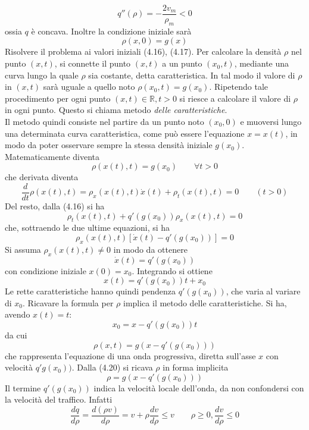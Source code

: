 \documentclass[a4paper,12pt, draft]{article}
\theoremstyle{break}
\numberwithin{equation}{section}
\begin{document}
\[
  q''(\rho) = -\frac{2v_m}{\rho_m} < 0
\]
ossia \(q\) è concava. Inoltre la condizione iniziale sarà 
\begin{equation}
  \rho(x, 0) = g(x)
\end{equation}
Risolvere il problema ai valori iniziali (4.16), (4.17). Per calcolare la densità \(\rho\) nel punto \((x,t)\), si connette il punto \((x,t)\) a un punto \((x_0, t)\), mediante una curva lungo la quale \(\rho\) sia costante, detta caratteristica.
In tal modo il valore di \(\rho\) in \((x,t)\) sarà uguale a quello noto \(\rho(x_0, t) = g(x_0)\). Ripetendo tale procedimento per ogni punto \((x,t) \in \mathbb{R}, t > 0\) si riesce a calcolare il valore di \(\rho\) in ogni punto. Questo si chiama metodo \emph{delle caratteristiche}. \\
Il metodo quindi consiste nel partire da un punto noto \((x_0, 0)\) e muoversi lungo una determinata curva caratteristica, come può essere l'equazione \(x = x(t)\), in modo da poter osservare sempre la stessa densità iniziale \(g(x_0)\).
Matematicamente diventa 
\begin{equation}
  \rho(x(t), t) = g(x_0) \qquad \forall t > 0
\end{equation}
che derivata diventa 
\[
\frac{d}{dt}\rho(x(t), t) = \rho_x(x(t), t) \dot{x}(t) +\rho_t(x(t), t) = 0 \qquad (t > 0)  
\]
Del resto, dalla (4.16) si ha
\[
  \rho_t(x(t), t) + q'(g(x_0))\rho_x(x(t), t) = 0
\]
che, sottraendo le due ultime equazioni, si ha 
\[
  \rho_x(x(t), t)[\dot{x}(t) - q'(g(x_0))] = 0
\]
Si assuma \(\rho_x(x(t), t) \not = 0\) in modo da ottenere
\[
  \dot{x}(t) = q'(g(x_0))
\]
con condizione iniziale \(x(0) = x_0\). Integrando si ottiene
\begin{equation}
  x(t) = q'(g(x_0))t + x_0
\end{equation}
Le rette caratteristiche hanno quindi pendenza \(q'(g(x_0))\), che varia al variare di \(x_0\). Ricavare la formula per \(\rho\) implica il metodo delle caratteristiche. Si ha, avendo \(x(t) = t\):
\[
  x_0 = x - q'(g(x_0))t
\]
da cui
\begin{equation}
  \rho(x,t) = g(x-q'(g(x_0)))
\end{equation}
che rappresenta l'equazione di una onda progressiva, diretta sull'asse \(x\) con velocità \(q'g(x_0))\). 
Dalla (4.20) si ricava \(\rho\) in forma implicita 
\[
  \rho = g(x - q'(g(x_0)))
\]
Il termine \(q'(g(x_0))\) indica la velocità locale dell'onda, da non confondersi con la velocità del traffico.
Infatti
\[
  \frac{dq}{d\rho} = \frac{d(\rho v)}{d\rho} = v + \rho\frac{dv}{d\rho} \leq v \qquad \rho \geq 0, \frac{dv}{d\rho} \leq 0
\]
\end{document}
